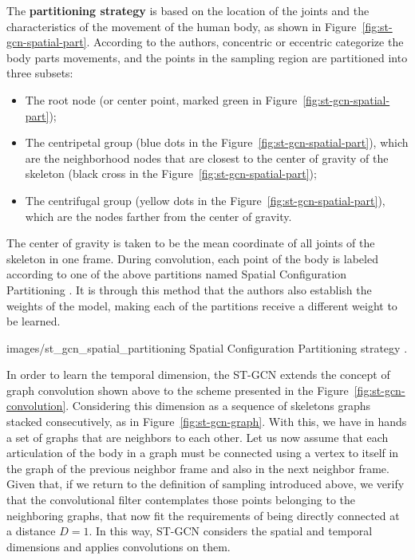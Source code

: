 The \textbf{partitioning strategy} is based on the location of the joints and the characteristics of the movement of the human body, as shown in Figure~\ref{fig:st-gcn-spatial-part}. According to the authors, concentric or eccentric categorize the body parts movements, and the points in the sampling region are partitioned into three subsets:
    
\begin{itemize}
    \item The root node (or center point, marked green in Figure~\ref{fig:st-gcn-spatial-part});
    \item The centripetal group (blue dots in the Figure~\ref{fig:st-gcn-spatial-part}), which are the neighborhood nodes that are closest to the center of gravity of the skeleton (black cross in the Figure~\ref{fig:st-gcn-spatial-part});
    \item The centrifugal group (yellow dots in the Figure~\ref{fig:st-gcn-spatial-part}), which are the nodes farther from the center of gravity.
\end{itemize}

The center of gravity is taken to be the mean coordinate of all joints of the skeleton in one frame. During convolution, each point of the body is labeled according to one of the above partitions named Spatial Configuration Partitioning \cite{st-gcn-2018}. It is through this method that the authors also establish the weights of the model, making each of the partitions receive a different weight to be learned.

    {images/st_gcn_spatial_partitioning}
    {Spatial Configuration Partitioning strategy \cite[p. 5]{st-gcn-2018}.}
    
In order to learn the temporal dimension, the ST-GCN extends the concept of graph convolution shown above to the scheme presented in the Figure~\ref{fig:st-gcn-convolution}. Considering this dimension as a sequence of skeletons graphs stacked consecutively, as in Figure~\ref{fig:st-gcn-graph}. With this, we have in hands a set of graphs that are neighbors to each other. Let us now assume that each articulation of the body in a graph must be connected using a vertex to itself in the graph of the previous neighbor frame and also in the next neighbor frame. Given that, if we return to the definition of sampling introduced above, we verify that the convolutional filter contemplates those points belonging to the neighboring graphs, that now fit the requirements of being directly connected at a distance $D = 1$. In this way, ST-GCN considers the spatial and temporal dimensions and applies convolutions on them.

